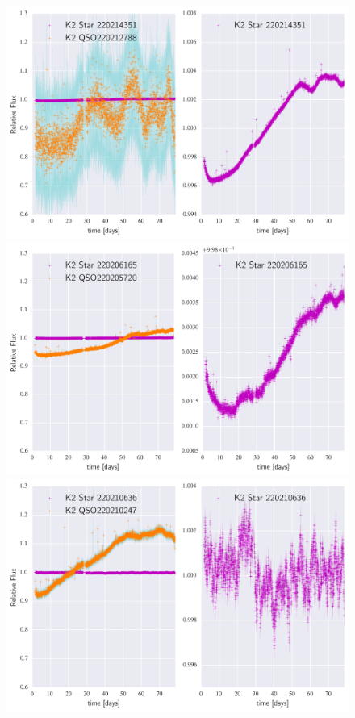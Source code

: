 \documentclass[a4paper,fleqn,usenatbib]{mnras}
\begin{document}
 
 
  \begin{figure}
 	\includegraphics[width=\columnwidth]{220212788NearestNeighbor.png}
 	\includegraphics[width=\columnwidth]{220205720NearestNeighbor.png}
 	\includegraphics[width=\columnwidth]{220210247NearestNeighbor.png}
  	\caption{}
  	\label{fig:example_figure}
  \end{figure}
  
\end{document}
